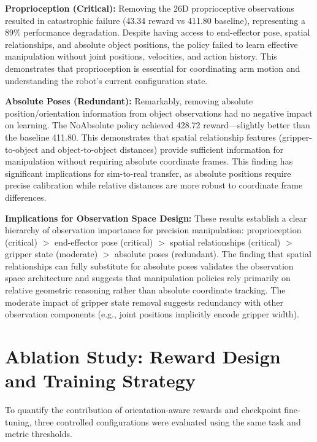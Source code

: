 \documentclass[12pt,a4paper,oneside]{report}
\begin{document}
\textbf{Proprioception (Critical):}
Removing the 26D proprioceptive observations resulted in catastrophic failure (43.34 reward vs 411.80 baseline), representing a 89\% performance degradation. Despite having access to end-effector pose, spatial relationships, and absolute object positions, the policy failed to learn effective manipulation without joint positions, velocities, and action history. This demonstrates that proprioception is essential for coordinating arm motion and understanding the robot's current configuration state.

\textbf{Absolute Poses (Redundant):}
Remarkably, removing absolute position/orientation information from object observations had no negative impact on learning. The NoAbsolute policy achieved 428.72 reward---slightly better than the baseline 411.80. This demonstrates that spatial relationship features (gripper-to-object and object-to-object distances) provide sufficient information for manipulation without requiring absolute coordinate frames. This finding has significant implications for sim-to-real transfer, as absolute positions require precise calibration while relative distances are more robust to coordinate frame differences.

\textbf{Implications for Observation Space Design:}
These results establish a clear hierarchy of observation importance for precision manipulation: proprioception (critical) $>$ end-effector pose (critical) $>$ spatial relationships (critical) $>$ gripper state (moderate) $>$ absolute poses (redundant). The finding that spatial relationships can fully substitute for absolute poses validates the observation space architecture and suggests that manipulation policies rely primarily on relative geometric reasoning rather than absolute coordinate tracking. The moderate impact of gripper state removal suggests redundancy with other observation components (e.g., joint positions implicitly encode gripper width).

\section{Ablation Study: Reward Design and Training Strategy}

To quantify the contribution of orientation-aware rewards and checkpoint fine-tuning, three controlled configurations were evaluated using the same task and metric thresholds.
\end{document}
